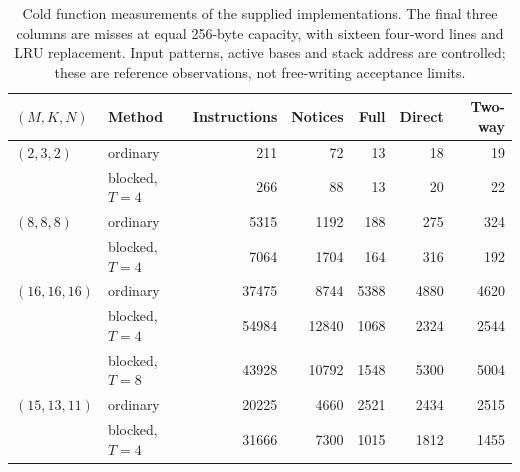 \begin{table}[htbp]
  \centering
  \small
  \setlength{\tabcolsep}{5pt}
  \begin{tabular}{llrrrrr}
    \toprule
    $(M,K,N)$    & Method         & Instructions & Notices & Full & Direct & Two-way \\
    \midrule
    $(2,3,2)$    & ordinary       & 211          & 72      & 13   & 18     & 19      \\
                 & blocked, $T=4$ & 266          & 88      & 13   & 20     & 22      \\
    $(8,8,8)$    & ordinary       & 5315         & 1192    & 188  & 275    & 324     \\
                 & blocked, $T=4$ & 7064         & 1704    & 164  & 316    & 192     \\
    $(16,16,16)$ & ordinary       & 37475        & 8744    & 5388 & 4880   & 4620    \\
                 & blocked, $T=4$ & 54984        & 12840   & 1068 & 2324   & 2544    \\
                 & blocked, $T=8$ & 43928        & 10792   & 1548 & 5300   & 5004    \\
    $(15,13,11)$ & ordinary       & 20225        & 4660    & 2521 & 2434   & 2515    \\
                 & blocked, $T=4$ & 31666        & 7300    & 1015 & 1812   & 1455    \\
    \bottomrule
  \end{tabular}
  \caption{Cold function measurements of the supplied implementations. The final three columns are misses at equal 256-byte capacity, with sixteen four-word lines and LRU replacement. Input patterns, active bases and stack address are controlled; these are reference observations, not free-writing acceptance limits.}
  \label{tab:revision-measurement-counts}
\end{table}
